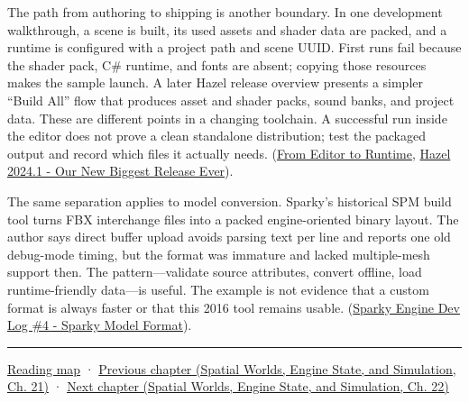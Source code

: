 The path from authoring to shipping is another boundary. In one development walkthrough, a scene is built, its used assets and shader data are packed, and a runtime is configured with a project path and scene UUID. First runs fail because the shader pack, C\# runtime, and fonts are absent; copying those resources makes the sample launch. A later Hazel release overview presents a simpler ``Build All'' flow that produces asset and shader packs, sound banks, and project data. These are different points in a changing toolchain. A successful run inside the editor does not prove a clean standalone distribution; test the packaged output and record which files it actually needs. (\href{https://www.youtube.com/watch?v=Z2U-S3fxAg8&t=18m4s}{From Editor to Runtime}, \href{https://www.youtube.com/watch?v=10OVd1VHEZ4&t=9m45s}{Hazel 2024.1 - Our New Biggest Release Ever}).

The same separation applies to model conversion. Sparky's historical SPM build tool turns FBX interchange files into a packed engine-oriented binary layout. The author says direct buffer upload avoids parsing text per line and reports one old debug-mode timing, but the format was immature and lacked multiple-mesh support then. The pattern---validate source attributes, convert offline, load runtime-friendly data---is useful. The example is not evidence that a custom format is always faster or that this 2016 tool remains usable. (\href{https://www.youtube.com/watch?v=EUy8G3uMitI&t=3m47s}{Sparky Engine Dev Log \#4 - Sparky Model Format}).

\begin{center}\rule{0.5\linewidth}{0.5pt}\end{center}

\hyperref[volume-reading-map]{Reading map} · \href{../05-Spatial-Worlds-Engine-State-and-Simulation/main.pdf\#nameddest=06-engine-ii-ch031-spatial-index-serialization-and-query-evidence}{Previous chapter (Spatial Worlds, Engine State, and Simulation, Ch. 21)} · \href{../05-Spatial-Worlds-Engine-State-and-Simulation/main.pdf\#nameddest=06-engine-ii-ch033-versioned-scenes-and-transactional-loading}{Next chapter (Spatial Worlds, Engine State, and Simulation, Ch. 22)}
